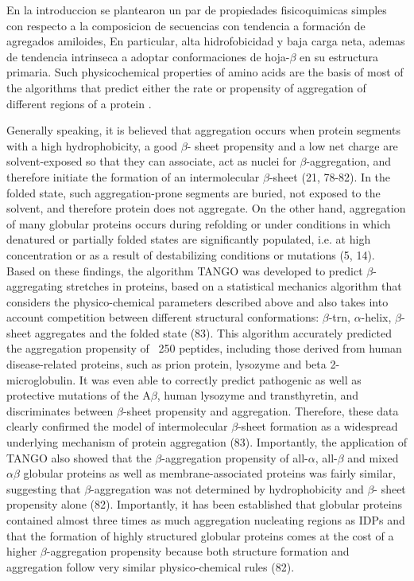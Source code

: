 En la introduccion se plantearon un par de propiedades fisicoquimicas simples con respecto a la composicion de secuencias con tendencia a formación de agregados amiloides,
En particular, alta hidrofobicidad y baja carga neta, ademas de tendencia intrinseca a adoptar conformaciones de hoja-$\beta$ en su estructura primaria.
Such physicochemical properties of amino acids are the basis of most of the algorithms that predict either the rate or propensity of aggregation of different regions of a protein .  


Generally speaking, it is believed that aggregation occurs when protein segments with a high hydrophobicity, a good $\beta$-
sheet propensity and a low net charge are solvent-exposed so that they can associate, act as nuclei for $\beta$-aggregation, and
therefore initiate the formation of an intermolecular $\beta$-sheet (21, 78-82). In the folded state, such aggregation-prone segments are
buried, not exposed to the solvent, and therefore protein does not aggregate. On the other hand, aggregation of many globular
proteins occurs during refolding or under conditions in which denatured or partially folded states are significantly populated, i.e.
at high concentration or as a result of destabilizing conditions or mutations (5, 14). Based on these findings, the algorithm
TANGO was developed to predict $\beta$-aggregating stretches in proteins, based on a statistical mechanics algorithm that considers
the physico-chemical parameters described above and also takes into account competition between different structural
conformations: $\beta$-trn, $\alpha$-helix, $\beta$-sheet aggregates and the folded state (83). This algorithm accurately predicted the aggregation
propensity of ~250 peptides, including those derived from human disease-related proteins, such as prion protein, lysozyme and
beta 2-microglobulin. It was even able to correctly predict pathogenic as well as protective mutations of the A$\beta$, human lysozyme
and transthyretin, and discriminates between $\beta$-sheet propensity and aggregation. Therefore, these data clearly confirmed the
model of intermolecular $\beta$-sheet formation as a widespread underlying mechanism of protein aggregation (83). Importantly, the
application of TANGO also showed that the $\beta$-aggregation propensity of all-$\alpha$, all-$\beta$ and mixed $\alpha\beta$ globular proteins as well as
membrane-associated proteins was fairly similar, suggesting that $\beta$-aggregation was not determined by hydrophobicity and $\beta$-
sheet propensity alone (82). Importantly, it has been established that globular proteins contained almost three times as much
aggregation nucleating regions as IDPs and that the formation of highly structured globular proteins comes at the cost of a higher
$\beta$-aggregation propensity because both structure formation and aggregation follow very similar physico-chemical rules (82).






